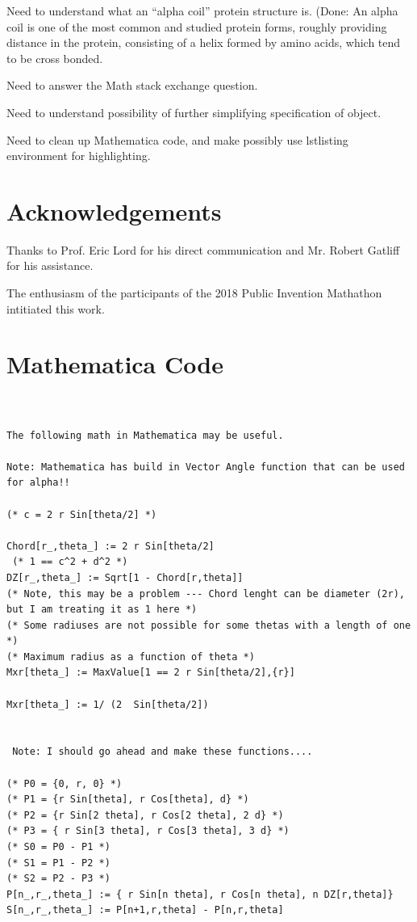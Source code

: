 \documentclass[11pt]{article}
\begin{document}
{Need to understand what an ``alpha coil'' protein structure is. (Done: An alpha coil is one of the most common
and studied protein forms, roughly providing distance in the protein, consisting of a helix formed by
amino acids, which tend to be cross bonded.

Need to answer the Math stack  exchange question.

Need to understand possibility of further simplifying specification of object.

Need to clean up Mathematica code, and make possibly use lstlisting environment for highlighting.

\section{Acknowledgements}

Thanks to Prof. Eric Lord for his direct communication and Mr. Robert Gatliff for his
assistance.

The enthusiasm of the participants of the 2018 Public Invention Mathathon
intitiated this work.




\appendix

\section{Mathematica Code}

\begin{verbatim}


The following math in Mathematica may be useful.

Note: Mathematica has build in Vector Angle function that can be used for alpha!!

(* c = 2 r Sin[theta/2] *)

Chord[r_,theta_] := 2 r Sin[theta/2]
 (* 1 == c^2 + d^2 *)
DZ[r_,theta_] := Sqrt[1 - Chord[r,theta]]
(* Note, this may be a problem --- Chord lenght can be diameter (2r), but I am treating it as 1 here *)
(* Some radiuses are not possible for some thetas with a length of one *)
(* Maximum radius as a function of theta *)
Mxr[theta_] := MaxValue[1 == 2 r Sin[theta/2],{r}]

Mxr[theta_] := 1/ (2  Sin[theta/2])


 Note: I should go ahead and make these functions....

(* P0 = {0, r, 0} *)
(* P1 = {r Sin[theta], r Cos[theta], d} *)
(* P2 = {r Sin[2 theta], r Cos[2 theta], 2 d} *)
(* P3 = { r Sin[3 theta], r Cos[3 theta], 3 d} *)
(* S0 = P0 - P1 *)
(* S1 = P1 - P2 *)
(* S2 = P2 - P3 *)
P[n_,r_,theta_] := { r Sin[n theta], r Cos[n theta], n DZ[r,theta]}
S[n_,r_,theta_] := P[n+1,r,theta] - P[n,r,theta]


\end{verbatim}}
\end{document}
